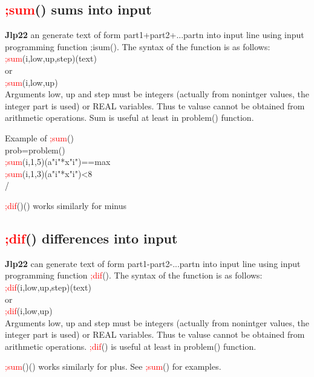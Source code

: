 \subsection{\textcolor{Red}{;sum}() sums into input}
\label{inpusum}
\textbf{Jlp22} an generate text of form part1+part2+...partn into input line using
input programming function ;isum(). The syntax of the function is as follows:\\
\textcolor{Red}{;sum}(i,low,up,step)(text)\\
or \\
\textcolor{Red}{;sum}(i,low,up)\\
Arguments low, up and step must be integers (actually from nonintger values, the
integer part is used) or REAL variables. Thus te valuse cannot be obtained
from arithmetic operations. Sum is useful at least in \textcolor{VioletRed}{problem}() function.
\begin{example}[inpusumex]Example of \textcolor{Red}{;sum}()\\
\label{inpusumex}
prob=\textcolor{VioletRed}{problem}()\\
\textcolor{Red}{;sum}(i,1,5)(a"i"*x"i")==max\\
\textcolor{Red}{;sum}(i,1,3)(a"i"*x"i")<8\\
/
\end{example}
\begin{note}
\textcolor{Red}{;dif}()() works similarly for minus
\end{note}
\subsection{\textcolor{Red}{;dif}() differences into input}
\label{inpudif}
\textbf{Jlp22} can generate text of form part1-part2-...partn into input line using
input programming function \textcolor{Red}{;dif}(). The syntax of the function is as follows:\\
\textcolor{Red}{;dif}(i,low,up,step)(text)\\
or \\
\textcolor{Red}{;dif}(i,low,up)\\
Arguments low, up and step must be integers (actually from nonintger values, the
integer part is used) or REAL variables. Thus te valuse cannot be obtained
from arithmetic operations. \textcolor{Red}{;dif}() is useful at least in \textcolor{VioletRed}{problem}() function.

\begin{note}
\textcolor{Red}{;sum}()() works similarly for plus. See \textcolor{Red}{;sum}() for examples.
\end{note}
